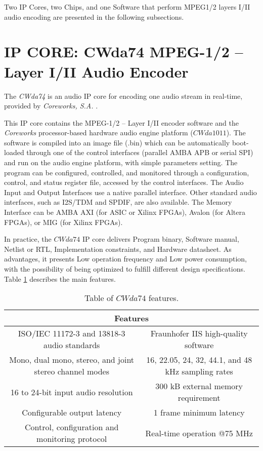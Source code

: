 Two IP Cores, two Chips, and one Software that perform MPEG1/2 layers I/II audio encoding are presented in the following subsections.

\section{IP CORE: CWda74 MPEG-1/2 – Layer I/II Audio Encoder}

The \textit{CWda74} \cite{CWda74} is an audio IP core for encoding one audio stream in real-time, provided by \textit{Coreworks, S.A.} \cite{coreworks}.

This IP core contains the MPEG-1/2 – Layer I/II encoder software and the \textit{Coreworks} processor-based hardware audio engine platform ($CWda1011$).
The software is compiled into an image file (.bin) which can be automatically boot-loaded through one of the control interfaces (parallel AMBA APB or serial SPI) and run on the audio engine platform, with simple parameters setting.
The program can be configured, controlled, and monitored through a configuration, control, and status register file, accessed by the control interfaces. The Audio Input and Output Interfaces use a native parallel interface. Other standard audio interfaces, such as I2S/TDM and SPDIF, are also available.
The Memory Interface can be AMBA AXI (for ASIC or Xilinx \cite{xilinx} FPGAs), Avalon (for Altera \cite{intel} FPGAs), or MIG (for Xilinx FPGAs).

In practice, the $CWda74$ IP core delivers Program binary, Software manual, Netlist or RTL, Implementation constraints, and Hardware datasheet.
As advantages, it presents Low operation frequency and Low power consumption, with the possibility of being optimized to fulfill different design specifications.
Table \ref{coreworks} describes the main features.

\begin{table}[h]
    \centering
    \begin{tabular}{|c|c|}
        \hline
        \multicolumn{2}{|c|}{\textbf{Features}} \\
        \hline
         ISO/IEC 11172-3 and 13818-3 audio standards & Fraunhofer IIS high-quality software \\
         \hline
         Mono, dual mono, stereo, and joint stereo channel modes & 16, 22.05, 24, 32, 44.1, and 48 kHz sampling rates \\
         \hline
         16 to 24-bit input audio resolution & 300 kB external memory requirement\\
         \hline
         Configurable output latency & 1 frame minimum latency\\
         \hline
         Control, configuration and monitoring protocol & Real-time operation @75 MHz \\
         \hline
    \end{tabular}
    \caption{Table of $CWda74$ features.}
    \label{coreworks}
\end{table}

